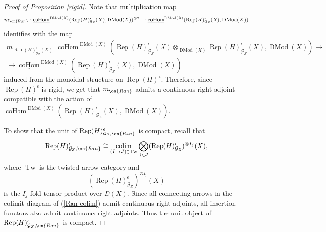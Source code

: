 \documentclass[9pt]{amsart}
\newcommand{\cG}{{\mathcal G}}
\newcommand{\Ranp}{{\on{Ran}}}
\DeclareMathOperator*{\colim}{colim}
\DeclareMathOperator{\Rep}{{Rep}}
\numberwithin{equation}{section}
\DeclareMathOperator{\D}{{DMod}}
\begin{document}
\begin{proof}[Proof of Proposition \ref{rigid}]
	Note that multiplication map
	\begin{equation}
		m_{\Ranp}: \underline{\operatorname{coHom}}^{\D(X)}(\Rep(H)_{\cG_Z}^{\epsilon}(X), \D(X)) ^{\otimes 2}  \rightarrow \underline{\operatorname{coHom}}^{\D(X)}(\Rep(H)_{\cG_Z}^{\epsilon}(X), \D(X))
	\end{equation}
	identifies with the map
	\begin{equation}
	\begin{split}
	m_{\Rep(H)_{\cG_Z}^{\epsilon}(X)}: \underline{\operatorname{coHom}}^{\D(X)}\left(\Rep(H)_{\cG_Z}^{\epsilon}(X) \otimes_{\D(X)} \Rep(H)_{\cG_Z}^{\epsilon}(X), \D(X)\right)  \rightarrow \\
	\rightarrow \underline{\operatorname{coHom}}^{\D(X)}\left(\Rep(H)_{\cG_Z}^{\epsilon}(X), \D(X)\right)  
	\end{split}
	\end{equation}
	induced from the monoidal structure on $\Rep(H)^{\epsilon}$. Therefore, since $\Rep(H)^{\epsilon}$ is rigid, we get that $m_{\Ranp}$ admits a continuous right adjoint compatible with the action of $\underline{\operatorname{coHom}}^{\D(X)}(\Rep(H)_{\cG_Z}^{\epsilon}(X), \D(X)) $.
	
	To show that the unit of $\Rep(H)_{\cG_Z, \Ranp}^{\epsilon}$ is compact, recall that 
	\begin{equation}\label{Ran colim}
		 \Rep(H)_{\cG_Z, \Ranp}^{\epsilon} \cong \colim\limits_{(I \rightarrow J) \in \operatorname{Tw}}\bigotimes_{j \in J} (\Rep(H)_{\cG_Z}^{\epsilon})^{\otimes I_j}(X),
	\end{equation}
	where $\operatorname{Tw}$ is the twisted arrow category and $$(\Rep(H)_{\cG_Z}^{\epsilon})^{\otimes I_j}(X)$$
	is the $I_j$-fold tensor product over $D(X)$. Since all connecting arrows in the colimit diagram of (\ref{Ran colim}) admit continuous right adjoints, all insertion functors also admit continuous right adjoints. Thus the unit object of $\Rep(H)_{\cG_Z, \Ranp}^{\epsilon}$ is compact.
\end{proof}
\end{document}
